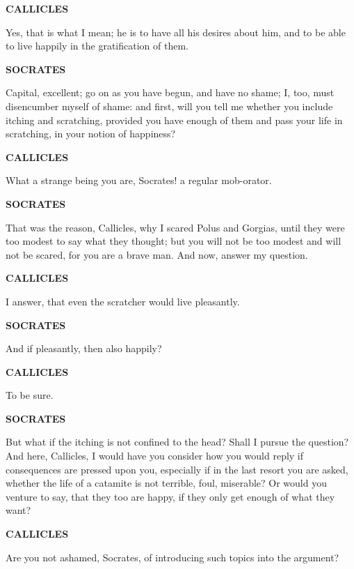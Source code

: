 \documentclass[11pt,letter]{article}
\begin{document}
\par \textbf{CALLICLES}
\par   Yes, that is what I mean; he is to have all his desires about him, and to be able to live happily in the gratification of them.

\par \textbf{SOCRATES}
\par   Capital, excellent; go on as you have begun, and have no shame; I, too, must disencumber myself of shame:  and first, will you tell me whether you include itching and scratching, provided you have enough of them and pass your life in scratching, in your notion of happiness?

\par \textbf{CALLICLES}
\par   What a strange being you are, Socrates! a regular mob-orator.

\par \textbf{SOCRATES}
\par   That was the reason, Callicles, why I scared Polus and Gorgias, until they were too modest to say what they thought; but you will not be too modest and will not be scared, for you are a brave man. And now, answer my question.

\par \textbf{CALLICLES}
\par   I answer, that even the scratcher would live pleasantly.

\par \textbf{SOCRATES}
\par   And if pleasantly, then also happily?

\par \textbf{CALLICLES}
\par   To be sure.

\par \textbf{SOCRATES}
\par   But what if the itching is not confined to the head? Shall I pursue the question? And here, Callicles, I would have you consider how you would reply if consequences are pressed upon you, especially if in the last resort you are asked, whether the life of a catamite is not terrible, foul, miserable? Or would you venture to say, that they too are happy, if they only get enough of what they want?

\par \textbf{CALLICLES}
\par   Are you not ashamed, Socrates, of introducing such topics into the argument?
\end{document}

